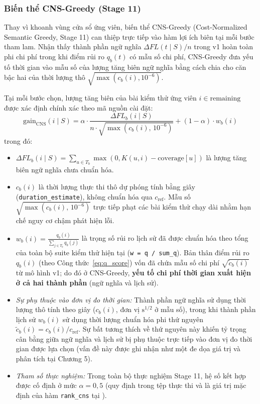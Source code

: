 \subsubsection{Biến thể CNS-Greedy (Stage 11)}
\label{subsubsec:cns_greedy}

Thay vì khoanh vùng cửa sổ ứng viên, biến thể CNS-Greedy (Cost-Normalized Semantic Greedy, Stage 11) can thiệp trực tiếp vào hàm lợi ích biên tại mỗi bước tham lam. Nhận thấy thành phần ngữ nghĩa $\Delta FL(t \mid S)/n$ trong v1 hoàn toàn phi chi phí trong khi điểm rủi ro $q_b(t)$ có mẫu số chi phí, CNS-Greedy đưa yếu tố thời gian vào mẫu số của lượng tăng biên ngữ nghĩa bằng cách chia cho căn bậc hai của thời lượng thô $\sqrt{\max(c_b(i), 10^{-6})}$.

Tại mỗi bước chọn, lượng tăng biên của bài kiểm thử ứng viên $i \in \text{remaining}$ được xác định chính xác theo mã nguồn cài đặt:
\begin{equation}
\label{eq:cns_gain}
\text{gain}_{\text{CNS}}(i \mid S) = \alpha \cdot \frac{\Delta FL_b(i \mid S)}{n \cdot \sqrt{\max\left(c_b(i), \, 10^{-6}\right)}} + (1 - \alpha) \cdot w_b(i)
\end{equation}
trong đó:
\begin{itemize}
    \item $\Delta FL_b(i \mid S) = \sum_{u \in T_b} \max\left(0, K(u, i) - \text{coverage}[u]\right)$ là lượng tăng biên ngữ nghĩa chưa chuẩn hóa.
    \item $c_b(i)$ là thời lượng thực thi thô dự phóng tính bằng giây (\texttt{duration\_estimate}), không chuẩn hóa qua $c_{\text{ref}}$. Mẫu số $\sqrt{\max\left(c_b(i), \, 10^{-6}\right)}$ trực tiếp phạt các bài kiểm thử chạy dài nhằm hạn chế nguy cơ chậm phát hiện lỗi.
    \item $w_b(i) = \frac{q_b(i)}{\sum_{j \in T_b} q_b(j)}$ là trọng số rủi ro lịch sử đã được chuẩn hóa theo tổng của toàn bộ suite kiểm thử hiện tại (\texttt{w = q / sum\_q}). Bản thân điểm rủi ro $q_b(i)$ (theo Công thức~\eqref{eq:q_score}) vốn đã chứa mẫu số chi phí $\sqrt{\widetilde{c}_b(i)}$ từ mô hình v1; do đó ở CNS-Greedy, \textbf{yếu tố chi phí thời gian xuất hiện ở cả hai thành phần} (ngữ nghĩa và lịch sử).
    \item \textit{Sự phụ thuộc vào đơn vị đo thời gian:} Thành phần ngữ nghĩa sử dụng thời lượng thô tính theo giây ($c_b(i)$, đơn vị $\text{s}^{1/2}$ ở mẫu số), trong khi thành phần lịch sử $w_b(i)$ sử dụng thời lượng chuẩn hóa phi thứ nguyên $\widetilde{c}_b(i) = c_b(i)/c_{\text{ref}}$. Sự bất tương thích về thứ nguyên này khiến tỷ trọng cân bằng giữa ngữ nghĩa và lịch sử bị phụ thuộc trực tiếp vào đơn vị đo thời gian được lựa chọn (vấn đề này được ghi nhận như một đe dọa giá trị và phân tích tại Chương 5).
    \item \textit{Tham số thực nghiệm:} Trong toàn bộ thực nghiệm Stage 11, hệ số kết hợp được cố định ở mức $\alpha = 0{,}5$ (quy định trong tệp thực thi  và là giá trị mặc định của hàm \texttt{rank\_cns} tại ).
\end{itemize}
